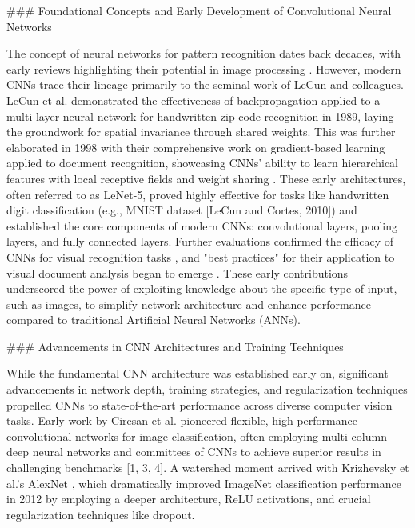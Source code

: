 \documentclass{article}
\begin{document}
\#\#\# Foundational Concepts and Early Development of Convolutional Neural Networks

The concept of neural networks for pattern recognition dates back decades, with early reviews highlighting their potential in image processing \cite{5}. However, modern CNNs trace their lineage primarily to the seminal work of LeCun and colleagues. LeCun et al. \cite{12} demonstrated the effectiveness of backpropagation applied to a multi-layer neural network for handwritten zip code recognition in 1989, laying the groundwork for spatial invariance through shared weights. This was further elaborated in 1998 with their comprehensive work on gradient-based learning applied to document recognition, showcasing CNNs' ability to learn hierarchical features with local receptive fields and weight sharing \cite{13}. These early architectures, often referred to as LeNet-5, proved highly effective for tasks like handwritten digit classification (e.g., MNIST dataset [LeCun and Cortes, 2010]) and established the core components of modern CNNs: convolutional layers, pooling layers, and fully connected layers. Further evaluations confirmed the efficacy of CNNs for visual recognition tasks \cite{14}, and "best practices" for their application to visual document analysis began to emerge \cite{15}. These early contributions underscored the power of exploiting knowledge about the specific type of input, such as images, to simplify network architecture and enhance performance compared to traditional Artificial Neural Networks (ANNs).

\#\#\# Advancements in CNN Architectures and Training Techniques

While the fundamental CNN architecture was established early on, significant advancements in network depth, training strategies, and regularization techniques propelled CNNs to state-of-the-art performance across diverse computer vision tasks. Early work by Ciresan et al. pioneered flexible, high-performance convolutional networks for image classification, often employing multi-column deep neural networks and committees of CNNs to achieve superior results in challenging benchmarks [1, 3, 4]. A watershed moment arrived with Krizhevsky et al.'s AlexNet \cite{11}, which dramatically improved ImageNet classification performance in 2012 by employing a deeper architecture, ReLU activations, and crucial regularization techniques like dropout.
\end{document}
